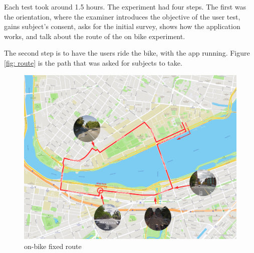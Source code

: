 Each test took around 1.5 hours. The experiment had four steps. The first
was the orientation, where the examiner introduces the objective of the
user test, gains subject's consent, asks for the initial survey, shows how
the application works, and talk about the route of the on bike experiment.

The second step is to have the users ride the bike, with the app running.
Figure \ref{fig: route} is the path that was asked for subjects to take.

\begin{figure}[!htb]
  \includegraphics[width=\textwidth]{chapters/4/fig/fixed_route.png}               
  \caption[on-bike fixed route]{on-bike fixed route}
  \label{fig:route}
\end{figure}

